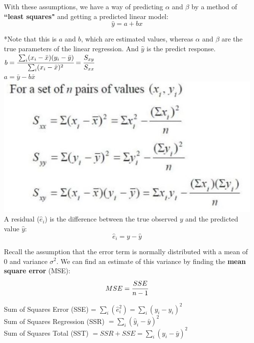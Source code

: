 \documentclass[12pt]{article}
\begin{document}
\noindent With these assumptions, we have a way of predicting $\alpha$ and $\beta$ by a method of \textbf{``least squares"} and getting a predicted linear model: \\
$$\hat{y} = a + bx$$

*Note that this is $a$ and $b$, which are estimated values, whereas $\alpha$ and $\beta$ are the true parameters of the linear regression. And $\hat{y}$ is the predict response.\\

$b=\cfrac{\sum_{i}(x_{i}-\bar{x})(y_{i}-\bar{y})}{\sum_{i}(x_{i}-\bar{x})^{2}} = \cfrac{S_{xy}}{S_{xx}}$\\

$a = \bar{y}-b\bar{x}$ \\

\includegraphics[scale = .75]{pic.JPG} \\

A residual ($\hat{e}_i$) is the difference between the true observed $y$ and the predicted value $\hat{y}$:\\
$$\hat{e}_i = y - \hat{y}$$

Recall the assumption that the error term is normally distributed with a mean of 0 and variance $\sigma^2$. We can find an estimate of this variance by finding the \textbf{mean square error} (MSE):\\
$$MSE = \cfrac{SSE}{n-1}$$

\noindent Sum of Squares Error (SSE) = $\sum_{i} (\hat{e}_i^{2}) = \sum_{i}(y_{i}-\hat{y}_i)^{2} $\\

\noindent Sum of Squares Regression (SSR) $ = \sum_{i}(\hat{y}_i-\bar{y})^{2} $\\

\noindent Sum of Squares Total (SST) $ = SSR + SSE = \sum_{i}(y_{i}-\bar{y})^{2}$\\
\end{document}
